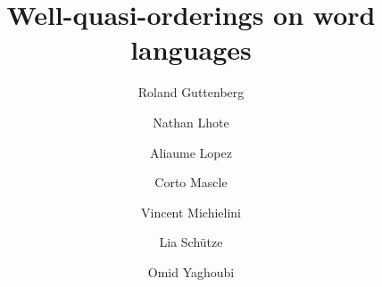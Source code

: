 %

\title{Well-quasi-orderings on word languages}
\author{%
        Roland Guttenberg \and
        Nathan Lhote \and
        Aliaume Lopez \and
        Corto Mascle \and
        Vincent Michielini \and
        Lia Schütze \and
        Omid Yaghoubi}


\newcommand{\makeabstract}{
\begin{abstract}
    The set of finite words over a well-quasi-ordered set is itself
    well-quasi-ordered. This seminal result by Higman is a cornerstone
    of the theory of well-quasi-orderings and has found numerous
    applications in computer science. However, this result is based on a
    specific choice of ordering on words, the (scattered) subword
    ordering. In this paper, to what extent other natural orderings
    (prefix, suffix, infix) on words can be used to derive Higman-like
    theorems. More specifically, we are interested in characterizing
    \emph{languages} of words that are well-quasi-ordered under these
    orderings. We show that a simple characterization is possible for
    the prefix and suffix orderings, and that under extra regularity
    assumptions, this also lifts to the infix ordering.
\end{abstract}
}
